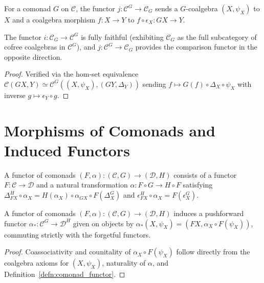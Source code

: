 \begin{definition}
  \label{defn:coalgebra_to_cokleisli}
  \leanok
  For a comonad $G$ on $\mathcal{C}$, the functor $j : \mathcal{C}^G \to \mathcal{C}_G$ sends a $G$-coalgebra $(X, \psi_X)$ to $X$ and a coalgebra morphism $f : X \to Y$ to $f \circ \epsilon_X : GX \to Y$.
\end{definition}

\begin{proposition}
  \label{prop:cokleisli_adj}
  \leanok
  The functor $i : \mathcal{C}_G \to \mathcal{C}^G$ is fully faithful (exhibiting $\mathcal{C}_G$ as the full subcategory of cofree coalgebras in $\mathcal{C}^G$), and $j : \mathcal{C}^G \to \mathcal{C}_G$ provides the comparison functor in the opposite direction.
\end{proposition}
\begin{proof}
  \leanok
  Verified via the hom-set equivalence $\mathcal{C}(GX, Y) \simeq \mathcal{C}^G((X,\psi_X), (GY,\Delta_Y))$ sending $f \mapsto G(f) \circ \Delta_X \circ \psi_X$ with inverse $g \mapsto \epsilon_Y \circ g$.
\end{proof}

\section{Morphisms of Comonads and Induced Functors}

\begin{definition}
  \label{defn:comonad_functor}
  \leanok
  A functor of comonads $(F, \alpha) : (\mathcal{C}, G) \to (\mathcal{D}, H)$ consists of a functor $F : \mathcal{C} \to \mathcal{D}$ and a natural transformation $\alpha : F \circ G \to H \circ F$ satisfying $\Delta^H_{FX} \circ \alpha_X = H(\alpha_X) \circ \alpha_{GX} \circ F(\Delta^G_X)$ and $\epsilon^H_{FX} \circ \alpha_X = F(\epsilon^G_X)$.
\end{definition}

\begin{proposition}
  \label{prop:comonad_pushforward}
  \leanok
  A functor of comonads $(F, \alpha) : (\mathcal{C}, G) \to (\mathcal{D}, H)$ induces a pushforward functor $\alpha_* : \mathcal{C}^G \to \mathcal{D}^H$ given on objects by $\alpha_*(X, \psi_X) = (FX, \alpha_X \circ F(\psi_X))$, commuting strictly with the forgetful functors.
\end{proposition}
\begin{proof}
  \leanok
  Coassociativity and counitality of $\alpha_X \circ F(\psi_X)$ follow directly from the coalgebra axioms for $(X, \psi_X)$, naturality of $\alpha$, and Definition~\ref{defn:comonad_functor}.
\end{proof}

